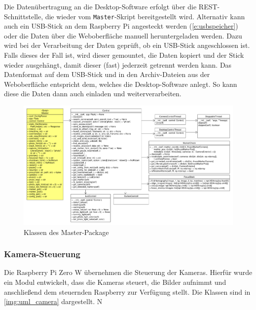 \documentclass[./00PhotoBox.tex]{subfiles}
\begin{document}
Die Datenübertragung an die Desktop-Software erfolgt über die REST-Schnittstelle, die wieder vom \texttt{Master}-Skript bereitgestellt wird. Alternativ kann auch ein USB-Stick an dem Raspberry Pi angesteckt werden (\autoref{e:usbspeicher}) oder die Daten über die Weboberfläche manuell heruntergeladen werden. Dazu wird bei der Verarbeitung der Daten geprüft, ob ein USB-Stick angeschlossen ist. Falls dieses der Fall ist, wird dieser gemountet, die Daten kopiert und der Stick wieder ausgehängt, damit dieser (fast) jederzeit getrennt werden kann. Das Datenformat auf dem USB-Stick und in den Archiv-Dateien aus der Weboberfläche entspricht dem, welches die Desktop-Software anlegt. So kann diese die Daten dann auch einladen und weiterverarbeiten.

\begin{figure}
  \centering
  \includegraphics[width=1\textwidth]{./img/uml/uml_master_classdiagramm.pdf}
  \caption{Klassen des Master-Package} %
  \label{img:master} %
\end{figure}


\subsubsection{Kamera-Steuerung}
Die Raspberry Pi Zero W übernehmen die Steuerung der Kameras. Hierfür wurde ein Modul entwickelt, dass die Kameras steuert, die Bilder aufnimmt und anschließend dem steuernden Raspberry zur Verfügung stellt. Die Klassen sind in \autoref{img:uml_camera} dargestellt. N
\end{document}
